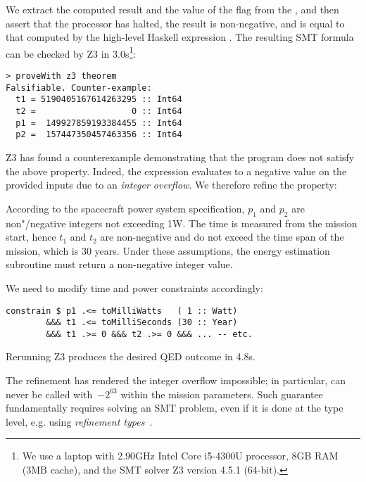 \noindent
We extract the computed result and the value of the flag  from the
, and then assert that the processor has halted, the result is
non-negative, and is equal to that computed by the high-level Haskell expression
.
The resulting SMT formula can be checked by Z3 in
3.0s\footnote{We use a laptop with 2.90GHz Intel Core i5-4300U processor, 8GB
RAM (3MB cache), and the SMT solver Z3 version 4.5.1 (64-bit).}:

\begin{verbatim}
> proveWith z3 theorem
Falsifiable. Counter-example:
  t1 = 5190405167614263295 :: Int64
  t2 =                   0 :: Int64
  p1 =  149927859193384455 :: Int64
  p2 =  157447350457463356 :: Int64
\end{verbatim}

\noindent
Z3 has found a counterexample demonstrating that the program does not
satisfy the above property. Indeed, the expression evaluates to a negative
value on the provided inputs due to an \emph{integer overflow}. We therefore
refine the property:

\begin{tcolorbox}
According to the spacecraft power system specification, $p_1$ and $p_2$ are
non"/negative integers not exceeding 1W. The time is measured
from the mission start, hence $t_1$ and $t_2$ are non-negative and do not exceed
the time span of the mission, which is 30 years. Under these assumptions,
the energy estimation subroutine must return a non-negative integer value.
\end{tcolorbox}

\noindent
We need to modify time and power constraints accordingly:

\begin{verbatim}
constrain $ p1 .<= toMilliWatts   ( 1 :: Watt)
        &&& t1 .<= toMilliSeconds (30 :: Year)
        &&& t1 .>= 0 &&& t2 .>= 0 &&& ... -- etc.
\end{verbatim}

\noindent
Rerunning Z3 produces the desired \textsf{QED} outcome in 4.8s.

The refinement has rendered the integer overflow impossible;
in particular,  can never be called with~$-2^{63}$
within the mission parameters. Such guarantee fundamentally requires
solving an SMT problem, even if it is done at the type level, e.g. using
\emph{refinement types}~\cite{vazou2014refinement}.

